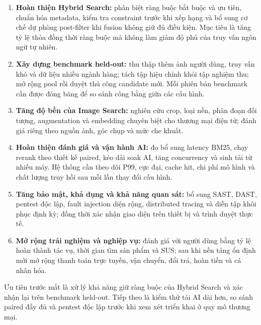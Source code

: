 \begin{enumerate}
    \item \textbf{Hoàn thiện Hybrid Search:} phân biệt ràng buộc bắt buộc và ưu tiên, chuẩn hóa metadata, kiểm tra constraint trước khi xếp hạng và bổ sung cơ chế dự phòng post-filter khi fusion không giữ đủ điều kiện. Mục tiêu là tăng tỷ lệ thỏa đồng thời ràng buộc mà không làm giảm độ phủ của truy vấn ngôn ngữ tự nhiên.

    \item \textbf{Xây dựng benchmark held-out:} thu thập thêm ảnh người dùng, truy vấn khó và dữ liệu nhiều ngành hàng; tách tập hiệu chỉnh khỏi tập nghiệm thu; mở rộng pool rồi duyệt thủ công candidate mới. Mỗi phiên bản benchmark cần được đóng băng để so sánh công bằng giữa các cấu hình.

    \item \textbf{Tăng độ bền của Image Search:} nghiên cứu crop, loại nền, phân đoạn đối tượng, augmentation và embedding chuyên biệt cho thương mại điện tử; đánh giá riêng theo nguồn ảnh, góc chụp và mức che khuất.

    \item \textbf{Hoàn thiện đánh giá và vận hành AI:} đo bổ sung latency BM25, chạy rerank theo thiết kế paired, kéo dài soak AI, tăng concurrency và sinh tải từ nhiều máy. Hệ thống cần theo dõi P99, cực đại, cache hit, chi phí mô hình và chất lượng truy hồi sau mỗi lần thay đổi cấu hình.

    \item \textbf{Tăng bảo mật, khả dụng và khả năng quan sát:} bổ sung SAST, DAST, pentest độc lập, fault injection diện rộng, distributed tracing và diễn tập khôi phục định kỳ; đồng thời xác nhận giao diện trên thiết bị và trình duyệt thực tế.

    \item \textbf{Mở rộng trải nghiệm và nghiệp vụ:} đánh giá với người dùng bằng tỷ lệ hoàn thành tác vụ, thời gian tìm sản phẩm và SUS; sau khi nền tảng ổn định mới mở rộng thanh toán trực tuyến, vận chuyển, đổi trả, hoàn tiền và cá nhân hóa.
\end{enumerate}

Ưu tiên trước mắt là xử lý khả năng giữ ràng buộc của Hybrid Search và xác nhận lại trên benchmark held-out. Tiếp theo là kiểm thử tải AI dài hơn, so sánh paired đầy đủ và pentest độc lập trước khi xem xét triển khai ở quy mô thương mại.
